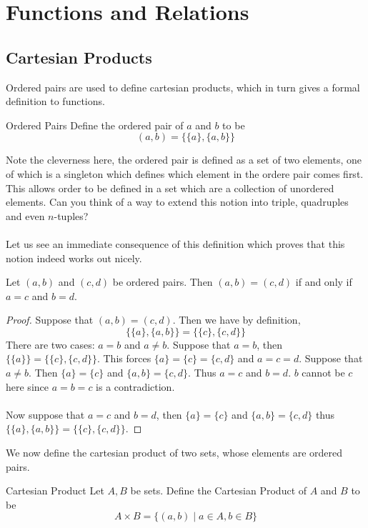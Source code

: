 \documentclass[a4paper]{article}
\begin{document}
\pagebreak
\section{Functions and Relations}
\subsection{Cartesian Products}
Ordered pairs are used to define cartesian products, which in turn gives a formal definition to functions. 
\begin{defn}{Ordered Pairs}{} Define the ordered pair of $a$ and $b$ to be $$(a,b)=\{\{a\},\{a,b\}\}$$
\end{defn}

Note the cleverness here, the ordered pair is defined as a set of two elements, one of which is a singleton which defines which element in the ordere pair comes first. This allows order to be defined in a set which are a collection of unordered elements. Can you think of a way to extend this notion into triple, quadruples and even $n$-tuples?\\~\\

Let us see an immediate consequence of this definition which proves that this notion indeed works out nicely. 

\begin{prp}{}{} Let $(a,b)$ and $(c,d)$ be ordered pairs. Then $(a,b)=(c,d)$ if and only if $a=c$ and $b=d$. \tcbline
\begin{proof} Suppose that $(a,b)=(c,d)$. Then we have by definition, $$\{\{a\},\{a,b\}\}=\{\{c\},\{c,d\}\}$$ There are two cases: $a=b$ and $a\neq b$. Suppose that $a=b$, then $\{\{a\}\}=\{\{c\},\{c,d\}\}$. This forces $\{a\}=\{c\}=\{c,d\}$ and $a=c=d$. Suppose that $a\neq b$. Then $\{a\}=\{c\}$ and $\{a,b\}=\{c,d\}$. Thus $a=c$ and $b=d$. $b$ cannot be $c$ here since $a=b=c$ is a contradiction. \\~\\

Now suppose that $a=c$ and $b=d$, then $\{a\}=\{c\}$ and $\{a,b\}=\{c,d\}$ thus $\{\{a\},\{a,b\}\}=\{\{c\},\{c,d\}\}$. 
\end{proof}
\end{prp}

We now define the cartesian product of two sets, whose elements are ordered pairs. 

\begin{defn}{Cartesian Product}{} Let $A,B$ be sets. Define the Cartesian Product of $A$ and $B$ to be $$A\times B=\{(a,b)\;|\;a\in A, b\in B\}$$
\end{defn}
\end{document}
